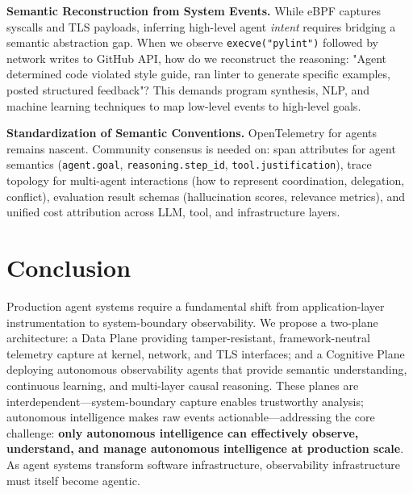 \documentclass[sigplan,screen,9pt]{acmart}
\begin{document}
\textbf{Semantic Reconstruction from System Events.} While eBPF captures syscalls and TLS payloads, inferring high-level agent \emph{intent} requires bridging a semantic abstraction gap. When we observe \texttt{execve("pylint")} followed by network writes to GitHub API, how do we reconstruct the reasoning: "Agent determined code violated style guide, ran linter to generate specific examples, posted structured feedback"? This demands program synthesis, NLP, and machine learning techniques to map low-level events to high-level goals.

\textbf{Standardization of Semantic Conventions.} OpenTelemetry for agents remains nascent. Community consensus is needed on: span attributes for agent semantics (\texttt{agent.goal}, \texttt{reasoning.step\_id}, \texttt{tool.justification}), trace topology for multi-agent interactions (how to represent coordination, delegation, conflict), evaluation result schemas (hallucination scores, relevance metrics), and unified cost attribution across LLM, tool, and infrastructure layers.

\section{Conclusion}

Production agent systems require a fundamental shift from application-layer instrumentation to system-boundary observability. We propose a two-plane architecture: a Data Plane providing tamper-resistant, framework-neutral telemetry capture at kernel, network, and TLS interfaces; and a Cognitive Plane deploying autonomous observability agents that provide semantic understanding, continuous learning, and multi-layer causal reasoning. These planes are interdependent—system-boundary capture enables trustworthy analysis; autonomous intelligence makes raw events actionable—addressing the core challenge: \textbf{only autonomous intelligence can effectively observe, understand, and manage autonomous intelligence at production scale}. As agent systems transform software infrastructure, observability infrastructure must itself become agentic.



\end{document}
